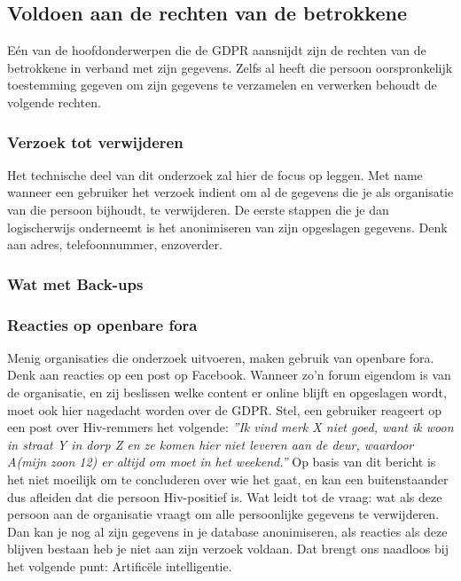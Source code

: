 \subsection{Voldoen aan de rechten van de betrokkene}

Eén van de hoofdonderwerpen die de GDPR aansnijdt zijn de rechten van de betrokkene in verband met zijn gegevens. Zelfs al heeft die persoon oorspronkelijk toestemming gegeven om zijn gegevens te verzamelen en verwerken behoudt de volgende rechten.

\subsubsection{Verzoek tot verwijderen}
Het technische deel van dit onderzoek zal hier de focus op leggen. Met name wanneer een gebruiker het verzoek indient om al de gegevens die je als organisatie van die persoon bijhoudt, te verwijderen. De eerste stappen die je dan logischerwijs onderneemt is het anonimiseren van zijn opgeslagen gegevens. Denk aan adres, telefoonnummer, enzoverder. 

\subsubsection{Wat met Back-ups}

\subsubsection{Reacties op openbare fora}
Menig organisaties die onderzoek uitvoeren, maken gebruik van openbare fora. Denk aan reacties op een post op Facebook. Wanneer zo'n forum eigendom is van de organisatie, en zij beslissen welke content er online blijft en opgeslagen wordt, moet ook hier nagedacht worden over de GDPR. Stel, een gebruiker reageert op een post over Hiv-remmers het volgende: \textit{”Ik vind merk X niet goed, want ik woon in straat Y in dorp Z en ze komen hier niet leveren aan de deur, waardoor A(mijn zoon 12) er altijd om moet in het weekend.”}
Op basis van dit bericht is het niet moeilijk om te concluderen over wie het gaat, en kan een buitenstaander dus afleiden dat die persoon Hiv-positief is. Wat leidt tot de vraag: wat als deze persoon aan de organisatie vraagt om alle persoonlijke gegevens te verwijderen. Dan kan je nog al zijn gegevens in je database anonimiseren, als reacties als deze blijven bestaan heb je niet aan zijn verzoek voldaan. Dat brengt ons naadloos bij het volgende punt: Artificële intelligentie. 

